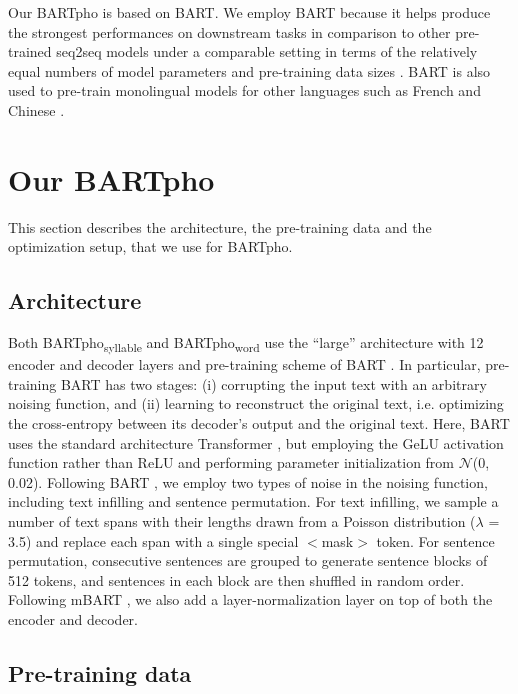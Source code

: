 \documentclass[a4paper]{article}
\begin{document}
Our BARTpho is based on BART. We employ BART because it helps produce the strongest performances  on  downstream tasks in comparison to other pre-trained seq2seq models under a comparable setting in terms  of the relatively equal numbers of model parameters and pre-training data sizes  \cite{lewis-etal-2020-bart,JMLR:v21:20-074,qi-etal-2020-prophetnet}. BART is also used to pre-train monolingual models for other languages such as French \cite{eddine2020barthez} and Chinese \cite{bartchinese}.







\section{Our BARTpho}
This section describes the architecture, the pre-training data and the optimization setup, that we use for BARTpho. 

\subsection{Architecture}
Both BARTpho\textsubscript{syllable} and BARTpho\textsubscript{word} use the ``large'' architecture with 12 encoder and decoder layers and pre-training scheme of BART  \cite{lewis-etal-2020-bart}. In particular, pre-training BART has two stages: (i) corrupting the input text with an arbitrary noising function, and (ii) learning to reconstruct the original text, i.e. optimizing the cross-entropy between its decoder’s output and the original text. Here, BART uses the standard architecture Transformer \cite{NIPS2017_3f5ee243}, but employing the GeLU activation function \cite{hendrycks2016gelu} rather than ReLU and performing parameter initialization from $\mathcal{N}$(0, 0.02). 
Following BART \cite{lewis-etal-2020-bart}, we employ two types of noise in the noising function, including text infilling and sentence permutation. For text infilling, we sample a number of text spans with their lengths drawn from a Poisson distribution ($\lambda$ = 3.5) and replace each span with a single special $<$mask$>$ token. For sentence permutation,
consecutive sentences are grouped to generate sentence blocks of 512 tokens, and sentences in each block are then shuffled in random order.  Following mBART \cite{tacl_a_00343}, we also add a layer-normalization layer on top of both the encoder and decoder. 



\subsection{Pre-training data}
\end{document}
